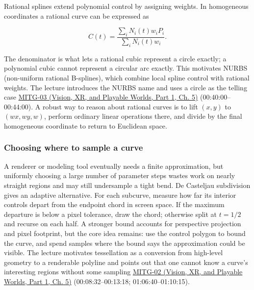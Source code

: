 Rational splines extend polynomial control by assigning weights. In homogeneous coordinates a rational curve can be expressed as

\[
C(t)=\frac{\sum_i N_i(t)w_iP_i}{\sum_i N_i(t)w_i}.
\]

The denominator is what lets a rational cubic represent a circle exactly; a polynomial cubic cannot represent a circular arc exactly. This motivates NURBS (non-uniform rational B-splines), which combine local spline control with rational weights. The lecture introduces the NURBS name and uses a circle as the telling case \href{../07-Vision-XR-and-Playable-Worlds-P01/main.pdf\#nameddest=04-visual-computing-ii-ch036-mitg-03---curves-and-surfaces}{MITG-03 (Vision, XR, and Playable Worlds, Part 1, Ch. 5)} (00:40:00--00:44:00). A robust way to reason about rational curves is to lift \((x,y)\) to \((wx,wy,w)\), perform ordinary linear operations there, and divide by the final homogeneous coordinate to return to Euclidean space.

\subsubsection{Choosing where to sample a curve}\label{03-visual-computing-i-ch001-choosing-where-to-sample-a-curve}

\hypertarget{03-visual-computing-i-ch001-choosing-where-to-sample-a-curve}{}

A renderer or modeling tool eventually needs a finite approximation, but uniformly choosing a large number of parameter steps wastes work on nearly straight regions and may still undersample a tight bend. De Casteljau subdivision gives an adaptive alternative. For each subcurve, measure how far its interior controls depart from the endpoint chord in screen space. If the maximum departure is below a pixel tolerance, draw the chord; otherwise split at \(t=1/2\) and recurse on each half. A stronger bound accounts for perspective projection and pixel footprint, but the core idea remains: use the control polygon to bound the curve, and spend samples where the bound says the approximation could be visible. The lecture motivates tessellation as a conversion from high-level geometry to a renderable polyline and points out that one cannot know a curve's interesting regions without some sampling \href{../07-Vision-XR-and-Playable-Worlds-P01/main.pdf\#nameddest=04-visual-computing-ii-ch036-mitg-02---cubic-curves}{MITG-02 (Vision, XR, and Playable Worlds, Part 1, Ch. 5)} (00:08:32--00:13:18; 01:06:40--01:10:15).

